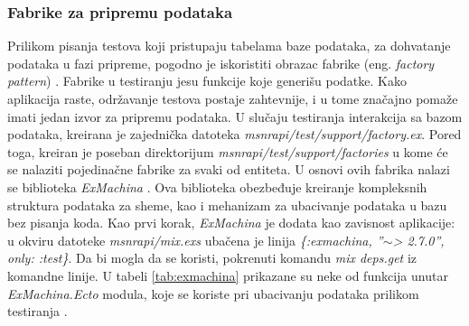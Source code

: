 \documentclass[12pt,oneside]{memoir}
\begin{document}
\subsubsection{Fabrike za pripremu podataka}
\par Prilikom pisanja testova koji pristupaju tabelama baze podataka, za dohvatanje podataka u fazi pripreme, pogodno je iskoristiti obrazac fabrike (eng. \emph{factory pattern}) \cite{fabrike}. Fabrike u testiranju jesu funkcije koje generišu podatke. Kako aplikacija raste, održavanje testova postaje zahtevnije, i u tome značajno pomaže imati jedan izvor za pripremu podataka. U slučaju testiranja interakcija sa bazom podataka, kreirana je zajednička datoteka \emph{msnr{\textunderscore}api/test/support/factory.ex}. Pored toga, kreiran je poseban direktorijum \emph{msnr{\textunderscore}api/test/support/factories} u kome će se nalaziti pojedinačne fabrike za svaki od entiteta. U osnovi ovih fabrika nalazi se biblioteka \emph{ExMachina} \cite{exmachina}. Ova biblioteka obezbeđuje kreiranje kompleksnih struktura podataka za sheme, kao i mehanizam za ubacivanje podataka u bazu bez pisanja koda. Kao prvi korak, \emph{ExMachina} je dodata kao zavisnost aplikacije: u okviru datoteke \emph{msnr{\textunderscore}api/mix.exs} ubačena je linija \textit{\{:exmachina, ''$\sim$> 2.7.0'', only: :test\}}. Da bi mogla da se koristi, pokrenuti komandu \emph{mix deps.get} iz komandne linije. U tabeli \ref{tab:exmachina} prikazane su neke od funkcija unutar \emph{ExMachina.Ecto} modula, koje se koriste pri ubacivanju podataka prilikom testiranja \cite{execto}.
\end{document}
